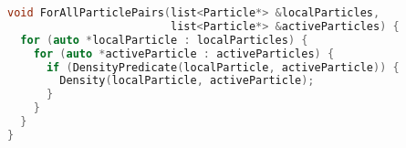 \begin{lstlisting}[language=C++,
                   label=algorithm:demonstrator:blueprint,
                   caption=Schematic illustration of the density loop,
                   basicstyle=\footnotesize]
void ForAllParticlePairs(list<Particle*> &localParticles,
                         list<Particle*> &activeParticles) {
  for (auto *localParticle : localParticles) {
    for (auto *activeParticle : activeParticles) {
      if (DensityPredicate(localParticle, activeParticle)) {
        Density(localParticle, activeParticle);
      }
    }
  }
}
\end{lstlisting}
